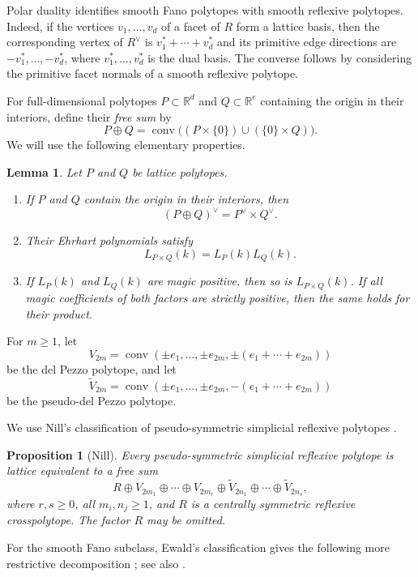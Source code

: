 \documentclass[10pt,a4paper]{amsart}
\newtheorem{Lemma}[Theorem]{Lemma}
\newtheorem{Proposition}[Theorem]{Proposition}
\theoremstyle{definition}
\newcommand{\RR}{\mathbb R}
\newcommand{\conv}{\operatorname{conv}}
\begin{document}
Polar duality identifies smooth Fano polytopes with smooth reflexive
polytopes.
Indeed, if the vertices $v_1,\ldots,v_d$ of a facet of $R$ form a
lattice basis, then the corresponding vertex of $R^\vee$ is
$v_1^*+\cdots+v_d^*$ and its primitive edge directions are
$-v_1^*,\ldots,-v_d^*$, where $v_1^*,\ldots,v_d^*$ is the dual basis.
The converse follows by considering the primitive facet normals
of a smooth reflexive polytope.

For full-dimensional polytopes $P\subset\RR^d$ and $Q\subset\RR^e$
containing the origin in their interiors, define their \emph{free sum} by
\[
P\oplus Q
=
\conv\bigl((P\times\{0\})\cup(\{0\}\times Q)\bigr).
\]
We will use the following elementary properties.

\begin{Lemma}\label{lem:closure}
Let $P$ and $Q$ be lattice polytopes.
\begin{enumerate}
\item If $P$ and $Q$ contain the origin in their interiors, then
\[
(P\oplus Q)^\vee=P^\vee\times Q^\vee.
\]
\item Their Ehrhart polynomials satisfy
\[
L_{P\times Q}(k)=L_P(k)L_Q(k).
\]
\item If $L_P(k)$ and $L_Q(k)$ are magic positive, then so is
$L_{P\times Q}(k)$.
If all magic coefficients of both factors are strictly positive,
then the same holds for their product.
\end{enumerate}
\end{Lemma}


For $m\ge1$, let
\[
V_{2m}
=
\conv\left(
\pm e_1,\ldots,\pm e_{2m},
\pm(e_1+\cdots+e_{2m})
\right)
\]
be the del Pezzo polytope, and let
\[
\widetilde V_{2m}
=
\conv\left(
\pm e_1,\ldots,\pm e_{2m},
-(e_1+\cdots+e_{2m})
\right)
\]
be the pseudo-del Pezzo polytope. 

We use Nill's classification of pseudo-symmetric simplicial reflexive
polytopes \cite[Theorem~0.1]{NillPseudoSymmetric}.

\begin{Proposition}[Nill]\label{prop:classification}
Every pseudo-symmetric simplicial reflexive polytope is lattice
equivalent to a free sum
\[
R
\oplus
V_{2m_1}\oplus\cdots\oplus V_{2m_r}
\oplus
\widetilde V_{2n_1}\oplus\cdots\oplus\widetilde V_{2n_s},
\]
where $r,s\ge0$, all $m_i,n_j\ge1$, and $R$ is a centrally symmetric
reflexive crosspolytope.  The factor $R$ may be omitted.
\end{Proposition}

For the smooth Fano subclass, Ewald's classification gives the following
more restrictive decomposition \cite{Ewald,EwaldBook};
see also \cite[Theorem~IV.2.1]{HaaseThesis}.
\end{document}
